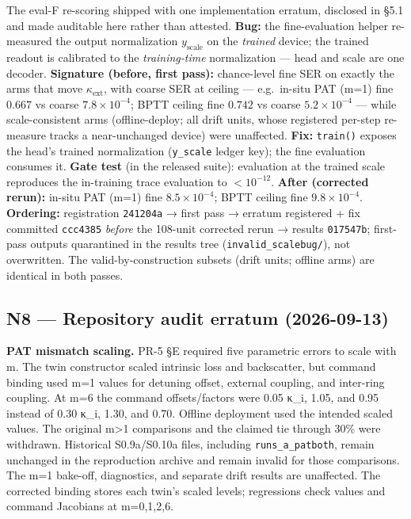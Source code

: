 \documentclass[
  10pt,
]{article}
\begin{document}
The eval-F re-scoring shipped with one implementation erratum, disclosed
in §5.1 and made auditable here rather than attested. \textbf{Bug:} the
fine-evaluation helper re-measured the output normalization
\(y_\text{scale}\) on the \emph{trained} device; the trained readout is
calibrated to the \emph{training-time} normalization --- head and scale
are one decoder. \textbf{Signature (before, first pass):} chance-level
fine SER on exactly the arms that move \(\kappa_\text{ext}\), with
coarse SER at ceiling --- e.g.~in-situ PAT (m=1) fine \(0.667\) vs
coarse \(7.8\times10^{-4}\); BPTT ceiling fine \(0.742\) vs coarse
\(5.2\times10^{-4}\) --- while scale-consistent arms (offline-deploy;
all drift units, whose registered per-step re-measure tracks a
near-unchanged device) were unaffected. \textbf{Fix:} \texttt{train()}
exposes the head's trained normalization (\texttt{y\_scale} ledger key);
the fine evaluation consumes it. \textbf{Gate test} (in the released
suite): evaluation at the trained scale reproduces the in-training trace
evaluation to \(<10^{-12}\). \textbf{After (corrected rerun):} in-situ
PAT (m=1) fine \(8.5\times10^{-4}\); BPTT ceiling fine
\(9.8\times10^{-4}\). \textbf{Ordering:} registration \texttt{241204a} →
first pass → erratum registered + fix committed \texttt{ccc4385}
\emph{before} the 108-unit corrected rerun → results \texttt{017547b};
first-pass outputs quarantined in the results tree
(\texttt{invalid\_scalebug/}), not overwritten. The
valid-by-construction subsets (drift units; offline arms) are identical
in both passes.

\subsection{N8 --- Repository audit erratum
(2026-09-13)}\label{n8-repository-audit-erratum-2026-09-13}

\textbf{PAT mismatch scaling.} PR-5 §E required five parametric errors
to scale with m. The twin constructor scaled intrinsic loss and
backscatter, but command binding used m=1 values for detuning offset,
external coupling, and inter-ring coupling. At m=6 the command
offsets/factors were 0.05 κ\_i, 1.05, and 0.95 instead of 0.30 κ\_i,
1.30, and 0.70. Offline deployment used the intended scaled values. The
original m\textgreater1 comparisons and the claimed tie through 30\%
were withdrawn. Historical S0.9a/S0.10a files, including
\texttt{runs\_a\_patboth}, remain unchanged in the reproduction archive
and remain invalid for those comparisons. The m=1 bake-off, diagnostics,
and separate drift results are unaffected. The corrected binding stores
each twin's scaled levels; regressions check values and command
Jacobians at m=0,1,2,6.
\end{document}
